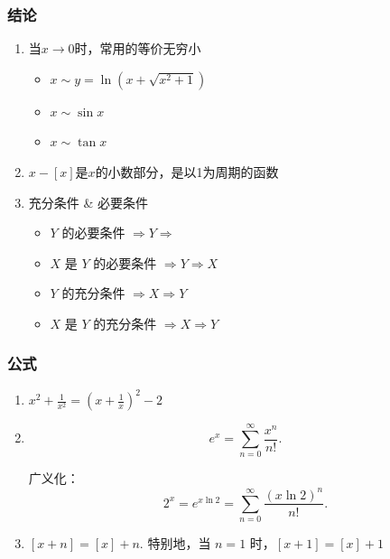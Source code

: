 \documentclass[../book.tex]{subfiles}
\begin{document}
    \subsubsection{结论}

    \begin{enumerate}
        \item 当$x \to 0$时，常用的等价无穷小
        \begin{itemize}
            \item $x \sim y = \ln\left(x + \sqrt{x^2 + 1}\right)$
            \item $x \sim \sin x$
            \item $x \sim \tan x$
        \end{itemize}
        \item $x-[x]$是$x$的小数部分，是以1为周期的函数
        \item 充分条件 \& 必要条件
        \begin{itemize}
            \item $Y$ 的必要条件 $\Rightarrow Y \Rightarrow$
            \item $X$ 是 $Y$ 的必要条件 $\Rightarrow Y \Rightarrow X$
            \item $Y$ 的充分条件 $\Rightarrow X \Rightarrow Y$
            \item $X$ 是 $Y$ 的充分条件 $\Rightarrow X \Rightarrow Y$
        \end{itemize}
    \end{enumerate}

    \subsubsection{公式}

    \begin{enumerate}
        \item $\displaystyle x^2 + \frac{1}{x^2} = (x + \frac{1}{x})^2 - 2$
        \item
        \[
            e^x = \sum_{n=0}^{\infty} \frac{x^n}{n!}.
        \]

        广义化：
        \[
            2^x = e^{x\ln 2}
            = \sum_{n=0}^{\infty} \frac{(x\ln 2)^n}{n!}.
        \]
        \item $[x + n] = [x] + n$.
        特别地，当 $n=1$ 时，$[x + 1] = [x] + 1$
    \end{enumerate}
\end{document}
